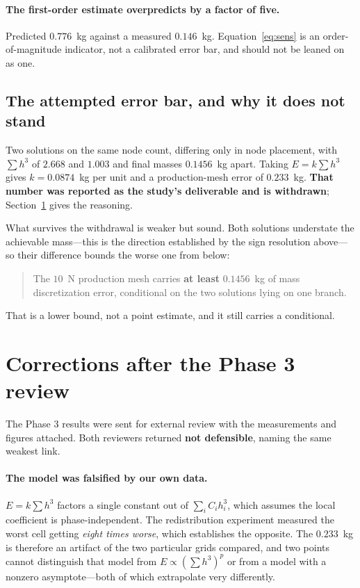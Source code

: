 \documentclass[11pt]{article}
\begin{document}
\paragraph{The first-order estimate overpredicts by a factor of five.} Predicted
$0.776$~kg against a measured $0.146$~kg. Equation~\eqref{eq:sens} is an
order-of-magnitude indicator, not a calibrated error bar, and should not be
leaned on as one.

\subsection{The attempted error bar, and why it does not stand}

Two solutions on the same node count, differing only in node placement, with
$\sum h^3$ of $2.668$ and $1.003$ and final masses $0.1456$~kg apart. Taking
$E = k\sum h^3$ gives $k = 0.0874$~kg per unit and a production-mesh error of
$0.233$~kg. \textbf{That number was reported as the study's deliverable and is
withdrawn}; Section~\ref{sec:corrections2} gives the reasoning.

What survives the withdrawal is weaker but sound. Both solutions understate the
achievable mass---this is the direction established by the sign resolution
above---so their difference bounds the worse one from below:

\begin{quote}
The $10$~N production mesh carries \textbf{at least} $0.1456$~kg of mass
discretization error, conditional on the two solutions lying on one branch.
\end{quote}

That is a lower bound, not a point estimate, and it still carries a conditional.

\section{Corrections after the Phase 3 review}
\label{sec:corrections2}

The Phase 3 results were sent for external review with the measurements and
figures attached. Both reviewers returned \textbf{not defensible}, naming the
same weakest link.

\paragraph{The model was falsified by our own data.} $E = k\sum h^3$ factors a
single constant out of $\sum_i C_i h_i^3$, which assumes the local coefficient
is phase-independent. The redistribution experiment measured the worst cell
getting \emph{eight times worse}, which establishes the opposite. The $0.233$~kg
is therefore an artifact of the two particular grids compared, and two points
cannot distinguish that model from $E\propto(\sum h^3)^p$ or from a model with a
nonzero asymptote---both of which extrapolate very differently.
\end{document}
